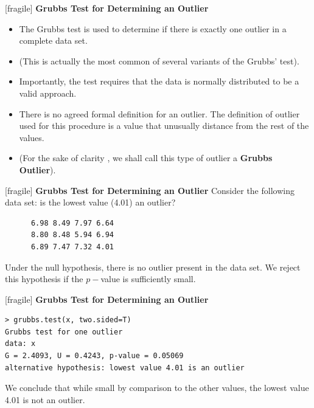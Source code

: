 \documentclass[a4]{beamer}
\begin{document}
[fragile]
\noindent \textbf{Grubbs Test for Determining an Outlier}

\begin{itemize}
\item The Grubbs test is used to determine if there is exactly one outlier in a complete data set.
\item (This is actually the most common of several variants of the Grubbs' test).
\item Importantly, the test requires that the data is normally distributed to be a valid approach.
\item There is no agreed formal definition for an outlier. The definition of outlier used for this procedure is a value that unusually distance from the rest of the values.
\item (For the sake of clarity , we shall call this type of outlier a \textbf{Grubbs Outlier}). 
\end{itemize}


[fragile]
\noindent \textbf{Grubbs Test for Determining an Outlier}
Consider the following data set: is the lowest value (4.01) an outlier?
\begin{verbatim}
      6.98 8.49 7.97 6.64
      8.80 8.48 5.94 6.94
      6.89 7.47 7.32 4.01
\end{verbatim}

Under the null hypothesis, there is no outlier present in the data set. 
We reject this hypothesis if the $p-$value is sufficiently small.


[fragile]
\noindent \textbf{Grubbs Test for Determining an Outlier}
\vspace{-1cm}
\begin{verbatim}
> grubbs.test(x, two.sided=T)
Grubbs test for one outlier
data: x
G = 2.4093, U = 0.4243, p-value = 0.05069
alternative hypothesis: lowest value 4.01 is an outlier
\end{verbatim}
We conclude that while small by comparison to the other values, the lowest value 4.01 is not an outlier.
\end{document}
